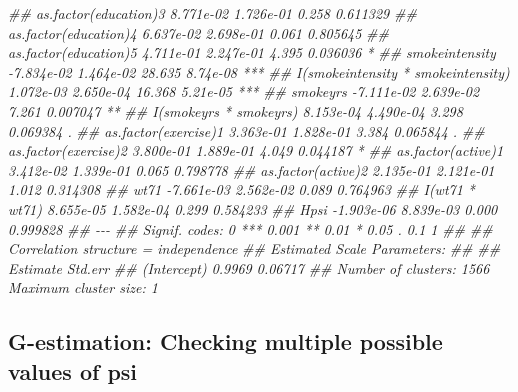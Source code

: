 \documentclass[
  10pt,
  a4paper,
]{book}
\newenvironment{Shaded}{\begin{snugshade}}{\end{snugshade}}
\newcommand{\DocumentationTok}[1]{\textcolor[rgb]{0.37,0.37,0.37}{\textit{#1}}}
\begin{document}
\begin{Shaded}
\begin{Highlighting}[]
\DocumentationTok{\#\# as.factor(education)3               8.771e{-}02  1.726e{-}01  0.258 0.611329    }
\DocumentationTok{\#\# as.factor(education)4               6.637e{-}02  2.698e{-}01  0.061 0.805645    }
\DocumentationTok{\#\# as.factor(education)5               4.711e{-}01  2.247e{-}01  4.395 0.036036 *  }
\DocumentationTok{\#\# smokeintensity                     {-}7.834e{-}02  1.464e{-}02 28.635 8.74e{-}08 ***}
\DocumentationTok{\#\# I(smokeintensity * smokeintensity)  1.072e{-}03  2.650e{-}04 16.368 5.21e{-}05 ***}
\DocumentationTok{\#\# smokeyrs                           {-}7.111e{-}02  2.639e{-}02  7.261 0.007047 ** }
\DocumentationTok{\#\# I(smokeyrs * smokeyrs)              8.153e{-}04  4.490e{-}04  3.298 0.069384 .  }
\DocumentationTok{\#\# as.factor(exercise)1                3.363e{-}01  1.828e{-}01  3.384 0.065844 .  }
\DocumentationTok{\#\# as.factor(exercise)2                3.800e{-}01  1.889e{-}01  4.049 0.044187 *  }
\DocumentationTok{\#\# as.factor(active)1                  3.412e{-}02  1.339e{-}01  0.065 0.798778    }
\DocumentationTok{\#\# as.factor(active)2                  2.135e{-}01  2.121e{-}01  1.012 0.314308    }
\DocumentationTok{\#\# wt71                               {-}7.661e{-}03  2.562e{-}02  0.089 0.764963    }
\DocumentationTok{\#\# I(wt71 * wt71)                      8.655e{-}05  1.582e{-}04  0.299 0.584233    }
\DocumentationTok{\#\# Hpsi                               {-}1.903e{-}06  8.839e{-}03  0.000 0.999828    }
\DocumentationTok{\#\# {-}{-}{-}}
\DocumentationTok{\#\# Signif. codes:  0 \textquotesingle{}***\textquotesingle{} 0.001 \textquotesingle{}**\textquotesingle{} 0.01 \textquotesingle{}*\textquotesingle{} 0.05 \textquotesingle{}.\textquotesingle{} 0.1 \textquotesingle{} \textquotesingle{} 1}
\DocumentationTok{\#\# }
\DocumentationTok{\#\# Correlation structure = independence }
\DocumentationTok{\#\# Estimated Scale Parameters:}
\DocumentationTok{\#\# }
\DocumentationTok{\#\#             Estimate Std.err}
\DocumentationTok{\#\# (Intercept)   0.9969 0.06717}
\DocumentationTok{\#\# Number of clusters:   1566  Maximum cluster size: 1}
\end{Highlighting}
\end{Shaded}

\subsection{G-estimation: Checking multiple possible values of psi}\label{g-estimation-checking-multiple-possible-values-of-psi}
\end{document}
